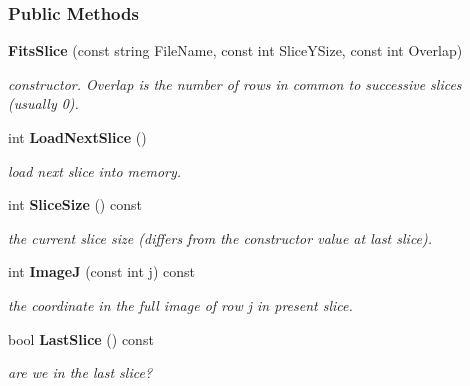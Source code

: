 \subsubsection*{Public Methods}
\begin{CompactItemize}
\item 
{}
{\bf Fits\-Slice} (const string File\-Name, const int Slice\-YSize, const int Overlap)\label{class_fitsslice_a0}

\begin{CompactList}\small\item\em constructor. Overlap is the number of rows in common to successive slices (usually 0).\item\end{CompactList}\item 
{}
int {\bf Load\-Next\-Slice} ()\label{class_fitsslice_a1}

\begin{CompactList}\small\item\em load next slice into memory.\item\end{CompactList}\item 
{}
int {\bf Slice\-Size} () const\label{class_fitsslice_a2}

\begin{CompactList}\small\item\em the current slice size (differs from the constructor value at last slice).\item\end{CompactList}\item 
{}
int {\bf Image\-J} (const int j) const\label{class_fitsslice_a3}

\begin{CompactList}\small\item\em the coordinate in the full image of row j in present slice.\item\end{CompactList}\item 
{}
bool {\bf Last\-Slice} () const\label{class_fitsslice_a4}

\begin{CompactList}\small\item\em are we in the last slice?\item\end{CompactList}\end{CompactItemize}


